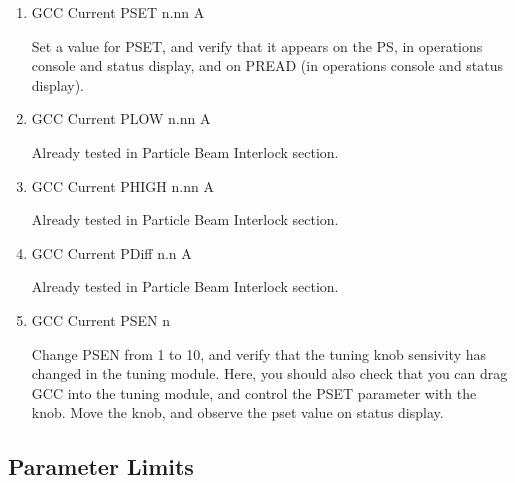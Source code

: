 \documentclass[11pt]{book}		%
\begin{document}
\begin{enumerate}
 \item GCC Current PSET  n.nn A

\color{red}
Set a value for PSET, and verify that it appears on the PS, in operations console and status display, and on PREAD (in operations console and status display).
\color{black}

 \item GCC Current PLOW  n.nn A

\color{red}
Already tested in Particle Beam Interlock section.
\color{black}

 \item GCC Current PHIGH n.nn A

\color{red}
Already tested in Particle Beam Interlock section.
\color{black}

 \item GCC Current PDiff n.n A

\color{red}
Already tested in Particle Beam Interlock section.
\color{black}

 \item GCC Current PSEN  n

\color{red}
Change PSEN from 1 to 10, and verify that the tuning knob sensivity has changed in the tuning module. Here, you should also check that you can drag GCC into the tuning module, and control the PSET parameter with the knob. Move the knob, and observe the pset value on status display.
\color{black}

\end{enumerate}


\subsection{Parameter Limits}
\end{document}
